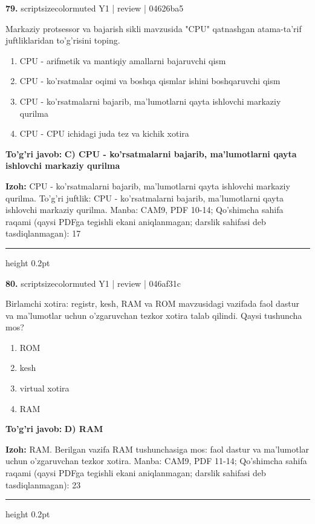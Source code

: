 \documentclass[10pt,a4paper]{article}
\begin{document}
{\bfseries\sffamily\color{ink} 79.} {scriptsizecolor{muted} Y1 | review | 04626ba5}
\par
Markaziy protsessor va bajarish sikli mavzusida "CPU" qatnashgan atama-ta'rif juftliklaridan to'g'risini toping.
\begin{enumerate}[label=\Alph*),leftmargin=9mm]
\item CPU - arifmetik va mantiqiy amallarni bajaruvchi qism
\item CPU - ko'rsatmalar oqimi va boshqa qismlar ishini boshqaruvchi qism
\item CPU - ko'rsatmalarni bajarib, ma'lumotlarni qayta ishlovchi markaziy qurilma
\item CPU - CPU ichidagi juda tez va kichik xotira
\end{enumerate}
\begin{tcolorbox}[enhanced,breakable,colback=teal!4,colframe=teal!60!black,boxrule=0.45pt,arc=1.2mm,left=2.7mm,right=2.7mm,top=1.8mm,bottom=1.8mm,before skip=2mm,after skip=2mm]
{\bfseries\sffamily\color{teal}To'g'ri javob:} \textbf{C) CPU - ko'rsatmalarni bajarib, ma'lumotlarni qayta ishlovchi markaziy qurilma}
\par\smallskip
{\bfseries Izoh:} CPU - ko'rsatmalarni bajarib, ma'lumotlarni qayta ishlovchi markaziy qurilma. To'g'ri juftlik: CPU - ko'rsatmalarni bajarib, ma'lumotlarni qayta ishlovchi markaziy qurilma. Manba: CAM9, PDF 10-14; Qo'shimcha sahifa raqami (qaysi PDFga tegishli ekani aniqlanmagan; darslik sahifasi deb tasdiqlanmagan): 17
\end{tcolorbox}
\vspace{2mm}\hrule height 0.2pt\vspace{3mm}

{\bfseries\sffamily\color{ink} 80.} {scriptsizecolor{muted} Y1 | review | 046af31c}
\par
Birlamchi xotira: registr, kesh, RAM va ROM mavzusidagi vazifada faol dastur va ma'lumotlar uchun o'zgaruvchan tezkor xotira talab qilindi. Qaysi tushuncha mos?
\begin{enumerate}[label=\Alph*),leftmargin=9mm]
\item ROM
\item kesh
\item virtual xotira
\item RAM
\end{enumerate}
\begin{tcolorbox}[enhanced,breakable,colback=teal!4,colframe=teal!60!black,boxrule=0.45pt,arc=1.2mm,left=2.7mm,right=2.7mm,top=1.8mm,bottom=1.8mm,before skip=2mm,after skip=2mm]
{\bfseries\sffamily\color{teal}To'g'ri javob:} \textbf{D) RAM}
\par\smallskip
{\bfseries Izoh:} RAM. Berilgan vazifa RAM tushunchasiga mos: faol dastur va ma'lumotlar uchun o'zgaruvchan tezkor xotira. Manba: CAM9, PDF 11-14; Qo'shimcha sahifa raqami (qaysi PDFga tegishli ekani aniqlanmagan; darslik sahifasi deb tasdiqlanmagan): 23
\end{tcolorbox}
\vspace{2mm}\hrule height 0.2pt\vspace{3mm}
\end{document}
